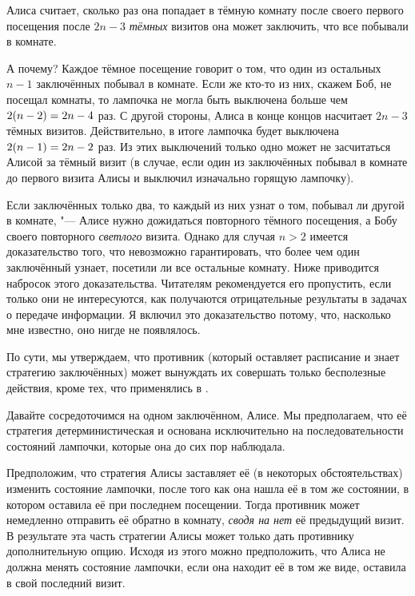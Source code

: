 \documentclass[twoside]{book}
\begin{document}
Алиса считает, сколько раз она попадает в тёмную комнату после своего первого 
посещения после $2n-3$ \emph{тёмных} визитов она может заключить, что все побывали в комнате.

А почему?
Каждое тёмное посещение говорит о том, что один из остальных $n-1$ заключённых побывал в комнате.
Если же кто-то из них, скажем Боб, не посещал комнаты, то лампочка не могла быть выключена больше чем $2(n-2)\z=2n-4$ раз.
С другой стороны, Алиса в конце концов насчитает $2n-3$ тёмных визитов.
Действительно, в итоге лампочка будет выключена $2(n-1)\z=2n-2$
раз.
Из этих выключений только одно может не засчитаться Алисой за тёмный визит (в случае, если один из заключённых побывал в комнате до первого визита Алисы и выключил изначально горящую лампочку).

Если заключённых только два, то каждый из них узнат о том, побывал ли другой в комнате, "---
Алисе нужно дожидаться повторного тёмного посещения, а Бобу своего повторного \emph{светлого} визита.
Однако для случая $n>2$ имеется доказательство того, что невозможно гарантировать, что более чем один заключённый узнает, посетили ли все остальные комнату.
Ниже приводится набросок этого доказательства.
Читателям рекомендуется его пропустить, если только они не интересуются, как получаются отрицательные результаты в задачах о передаче информации.
Я включил это доказательство потому, что, насколько мне известно, оно нигде не появлялось.

По сути, мы утверждаем, что противник (который оставляет расписание и знает стратегию заключённых) может вынуждать их совершать только бесполезные действия, кроме тех, что применялись в .

Давайте сосредоточимся на одном заключённом, Алисе.
Мы предполагаем, что её стратегия детерминистическая и основана исключительно на последовательности состояний лампочки, которые она до сих пор наблюдала.

Предположим, что стратегия Алисы заставляет её (в некоторых обстоятельствах) изменить состояние лампочки, после того как она нашла её в том же состоянии, в котором оставила её при последнем посещении.
Тогда противник может немедленно отправить её обратно в комнату, \emph{сводя на нет} её предыдущий визит.
В результате эта часть стратегии Алисы может только дать противнику дополнительную опцию.
Исходя из этого можно предположить, что Алиса не должна менять состояние лампочки, если она находит её в том же виде,  оставила в свой последний визит.
\end{document}
